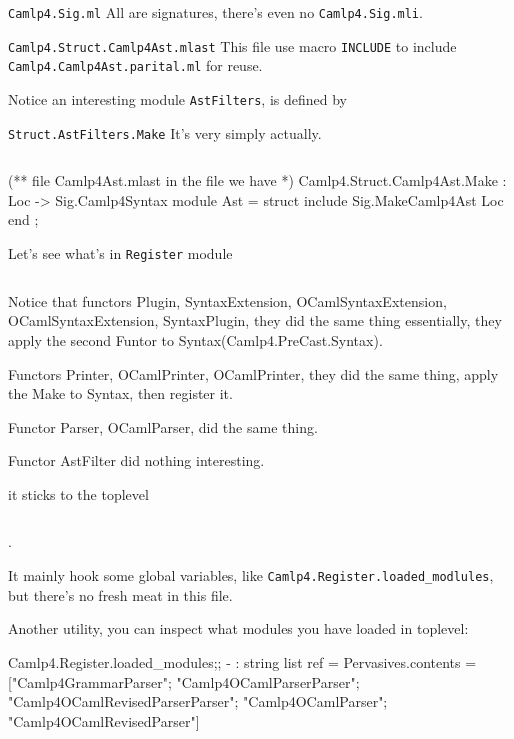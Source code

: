 \verb|Camlp4.Sig.ml| All are signatures, there's even no
\verb|Camlp4.Sig.mli|.

\verb|Camlp4.Struct.Camlp4Ast.mlast| This file use macro
\verb|INCLUDE| to include \verb|Camlp4.Camlp4Ast.parital.ml| for
reuse.
    
Notice an interesting module \verb|AstFilters|, is defined by 

\verb|Struct.AstFilters.Make|
It's very simply actually.

\inputminted[fontsize=\scriptsize,]{ocaml}{camlp4/code/AstFilters.ml}

\begin{ocamlcode}
(** file Camlp4Ast.mlast 
  in the file we have *)
Camlp4.Struct.Camlp4Ast.Make : Loc -> Sig.Camlp4Syntax
  module Ast = struct
     include Sig.MakeCamlp4Ast Loc 
  end ;
\end{ocamlcode}


Let's see what's in \verb|Register| module
\inputminted[fontsize=\scriptsize,
            ]{ocaml}{camlp4/code/Register.ml}


Notice that functors Plugin, SyntaxExtension, OCamlSyntaxExtension,
OCamlSyntaxExtension, SyntaxPlugin, they did the same thing
essentially, they apply the second Funtor to Syntax(Camlp4.PreCast.Syntax).

Functors Printer, OCamlPrinter, OCamlPrinter, they did the same thing,
apply the Make to Syntax, then register it. 

Functor Parser, OCamlParser, did the same thing. 

Functor AstFilter  did nothing interesting.

it sticks to the toplevel 

\inputminted[fontsize=\scriptsize,
             firstline=123,
             lastline=126,
            ]{ocaml}{camlp4/code/Register.ml}.

It mainly hook some global variables, like
\verb|Camlp4.Register.loaded_modlules|, but there's no fresh meat in
this file.


Another utility, you can inspect what modules you have loaded in toplevel:
\begin{ocamlcode}
Camlp4.Register.loaded_modules;;
- : string list ref =
{Pervasives.contents =
  ["Camlp4GrammarParser"; "Camlp4OCamlParserParser";
   "Camlp4OCamlRevisedParserParser"; "Camlp4OCamlParser";
   "Camlp4OCamlRevisedParser"]}
\end{ocamlcode}



